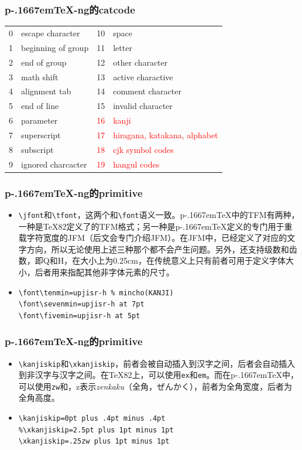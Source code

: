 \documentclass[dvipdfmx]{beamer}
\newcommand{\pTeX}{p\kern-.1667em\TeX}
\newcommand{\ptexng}{\pTeX-ng}
\begin{document}
\begin{frame}[fragile]
\frametitle{\bf \ptexng 的catcode}
\begin{center}
\newcommand{\pcc}[1]{\textcolor{red}{#1}}
\begin{tabular}{clcl}
0&escape character&10&space\\
1&beginning of group&11&letter\\
2&end of group&12&other character\\
3&math shift&13&active charactive\\
4&alignment tab&14&comment character\\
5&end of line&15&invalid character\\
6&parameter&\pcc{16}&\pcc{kanji}\\
7&superscript&\pcc{17}&\pcc{hiragana, katakana, alphabet}\\
8&subscript&\pcc{18}&\pcc{cjk symbol codes}\\
9&ignored charcacter&\pcc{19}&\pcc{hangul codes}\\
\end{tabular}
\end{center}
\end{frame}
%
\begin{frame}[fragile]
\frametitle{\bf \ptexng 的primitive}
\begin{itemize}
\item \verb!\jfont!和\verb!\tfont!，这两个和\verb!\font!语义一致。\pTeX 中的TFM有两种，一种是\TeX82定义了的TFM格式；另一种是\pTeX 定义的专门用于重载字符宽度的JFM（后文会专门介绍JFM）。在JFM中，已经定义了对应的文字方向，所以无论使用上述三种那个都不会产生问题。另外，还支持级数和齿数，即Q和H，在大小上为0.25cm，在传统意义上只有前者可用于定义字体大小，后者用来指配其他非字体元素的尺寸。
\item \begin{verbatim}
\font\tenmin=upjisr-h % mincho(KANJI)
\font\sevenmin=upjisr-h at 7pt
\font\fivemin=upjisr-h at 5pt
\end{verbatim}
\end{itemize}
\end{frame}
%
\begin{frame}[fragile]
\frametitle{\bf \ptexng 的primitive}
\begin{itemize}
\item \verb!\kanjiskip!和\verb!\xkanjiskip!，前者会被自动插入到汉字之间，后者会自动插入到非汉字与汉字之间。在\TeX82上，可以使用\texttt{ex}和\texttt{em}。而在\pTeX 中，可以使用\texttt{zw}和，z表示\textit{zenkaku}（全角，ぜんかく），前者为全角宽度，后者为全角高度。
\item \begin{verbatim}
\kanjiskip=0pt plus .4pt minus .4pt
%\xkanjiskip=2.5pt plus 1pt minus 1pt
\xkanjiskip=.25zw plus 1pt minus 1pt
\end{verbatim}
\end{itemize}
\end{frame}
\end{document}
